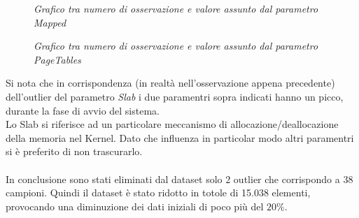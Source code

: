 \begin{figure}[H]
	\centering   
	\caption{\textit{Grafico tra numero di osservazione e valore assunto dal parametro Mapped}}
	\caption{\textit{Grafico tra numero di osservazione e valore assunto dal parametro PageTables}}
\end{figure}
Si nota che in corrispondenza (in realtà nell'osservazione appena precedente) dell'outlier del parametro \textit{Slab} i due paramentri sopra indicati hanno un picco, durante la fase di avvio del sistema.
\\Lo Slab si riferisce ad un particolare meccanismo di allocazione/deallocazione della memoria nel Kernel. Dato che influenza in particolar modo altri paramentri si è preferito di non trascurarlo.
\\
\vspace{0.5cm}
\\
In conclusione sono stati eliminati dal dataset solo 2 outlier che corrispondo a 38 campioni. Quindi il dataset è stato ridotto in totole di 15.038 elementi, provocando una diminuzione dei dati iniziali di poco più del $20\%$.
\newpage

